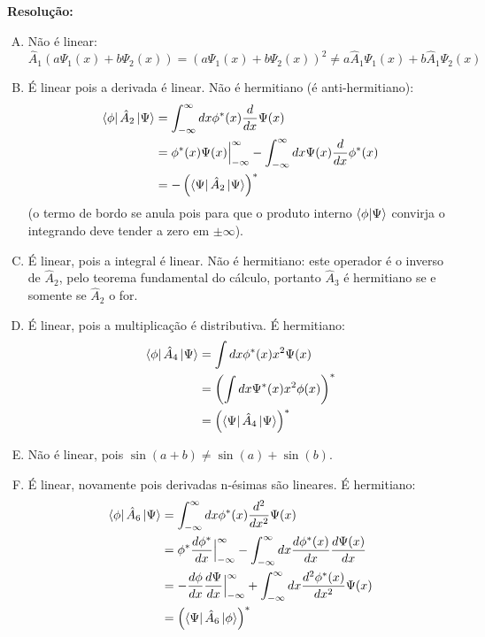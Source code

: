 \documentclass[a4paper, 12pt, notitlepage]{article}
\begin{document}
\begin{enumerate}
\textbf{Resolução: }
\begin{enumerate}[(A)]
  \item Não é linear:
  \[ \hat{A}_1 \left(a\Psi_1(x) + b\Psi_2(x)\right) = \left(a\Psi_1(x) + b\Psi_2(x)\right)^2 \neq a \hat{A}_1 \Psi_1(x) + b \hat{A}_1 \Psi_2(x) \]
  \item É linear pois a derivada é linear. Não é hermitiano (é anti-hermitiano):
  \begin{align*}
    \bra{\phi} \hat{A}_2 \ket{\Psi} &= \int_{-\infty}^{\infty} dx \phi^\ast(x) \frac{d}{dx} \Psi(x) \\
    &= \phi^\ast(x) \Psi(x) \Big|_{-\infty}^{\infty} - \int_{-\infty}^\infty dx \Psi(x) \frac{d}{dx} \phi^\ast(x) \\
    &= -\left(\bra{\Psi} \hat{A}_2 \ket{\Psi}\right)^\ast
  \end{align*}
  \noindent (o termo de bordo se anula pois para que o produto interno $\bra{\phi}\ket{\Psi}$ convirja o integrando deve tender a zero em $\pm \infty$).
  \item É linear, pois a integral é linear. Não é hermitiano: este operador é o inverso de $\hat{A}_2$, pelo teorema fundamental do cálculo, portanto $\hat{A}_3$ é hermitiano se e somente se $\hat{A}_2$ o for.
  \item É linear, pois a multiplicação é distributiva. É hermitiano:
  \begin{align*}
    \bra{\phi} \hat{A}_4 \ket{\Psi} &= \int dx \phi^\ast(x) x^2 \Psi(x) \\
    &= \left(\int dx \Psi^\ast(x) x^2 \phi(x)\right)^\ast \\
    &= \left(\bra{\Psi} \hat{A}_4 \ket{\Psi}\right)^\ast
  \end{align*}
  \item Não é linear, pois $\sin(a + b) \neq \sin(a) + \sin(b)$.
  \item É linear, novamente pois derivadas n-ésimas são lineares. É hermitiano:
  \begin{align*}
    \bra{\phi} \hat{A}_6 \ket{\Psi} &= \int_{-\infty}^{\infty} dx \phi^\ast(x) \frac{d^2}{dx^2} \Psi(x) \\
    &= \phi^\ast \frac{d\phi^\ast}{dx} \Big|_{-\infty}^{\infty} - \int_{-\infty}^{\infty} dx \frac{d \phi^\ast(x)}{dx} \frac{d\Psi(x)}{dx} \\
    &= -\frac{d\phi}{dx} \frac{d\Psi}{dx}\Big|_{-\infty}^{\infty} + \int_ {-\infty}^{\infty} dx \frac{d^2 \phi^\ast(x)}{dx^2} \Psi(x) \\
    &= \left(\bra{\Psi} \hat{A}_6 \ket{\phi} \right)^\ast

\end{align*}
\end{enumerate}
\end{enumerate}
\end{document}
